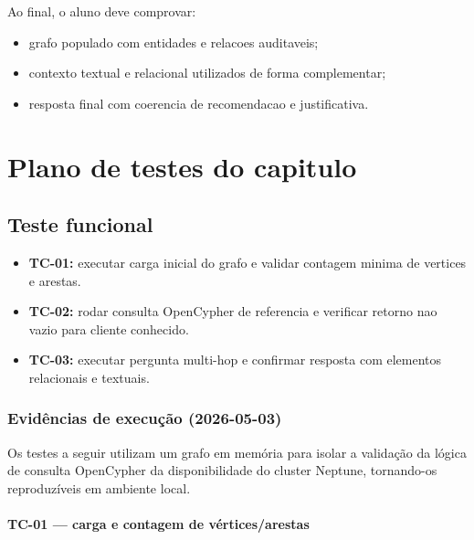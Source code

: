 Ao final, o aluno deve comprovar:

\begin{itemize}[leftmargin=*]
  \item grafo populado com entidades e relacoes auditaveis;
  \item contexto textual e relacional utilizados de forma complementar;
  \item resposta final com coerencia de recomendacao e justificativa.
\end{itemize}

\section{Plano de testes do capitulo}

\subsection{Teste funcional}

\begin{itemize}[leftmargin=*]
  \item \textbf{TC-01:} executar carga inicial do grafo e validar contagem
        minima de vertices e arestas.
  \item \textbf{TC-02:} rodar consulta OpenCypher de referencia e verificar
        retorno nao vazio para cliente conhecido.
  \item \textbf{TC-03:} executar pergunta multi-hop e confirmar resposta com
        elementos relacionais e textuais.
\end{itemize}

\subsubsection*{Evid\^encias de execu\c{c}\~ao (2026-05-03)}

Os testes a seguir utilizam um grafo em mem\'oria para isolar a
valida\c{c}\~ao da l\'ogica de consulta OpenCypher da disponibilidade
do cluster Neptune, tornando-os reproduz\'iveis em ambiente local.

\paragraph{TC-01 --- carga e contagem de v\'ertices/arestas}

